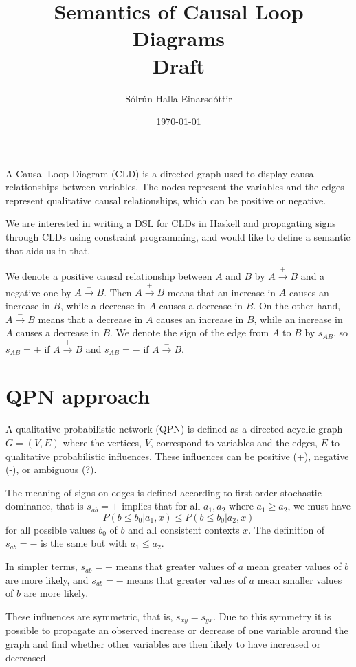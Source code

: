 \documentclass[a4paper,11pt]{article}
\title{Semantics of Causal Loop Diagrams\\ Draft}
\author{Sólrún Halla Einarsdóttir}
\date{\today}
\begin{document}
\maketitle
A Causal Loop Diagram (CLD) is a directed graph used to display causal
relationships between variables. The nodes represent the variables and the edges
represent qualitative causal relationships, which can be positive or negative.

We are interested in writing a DSL for CLDs in Haskell and propagating signs through CLDs
using constraint programming, and would like to define a semantic that aids us in that.

We denote a positive causal relationship between $A$ and $B$ by $A\xrightarrow{+} B$ and
a negative one by $A \xrightarrow{-} B$. Then $A \xrightarrow{+} B$ means that
an increase in $A$ causes an increase in $B$, while a decrease in $A$ causes a
decrease in $B$. On the other hand, $A\xrightarrow{-} B$ means that a decrease in $A$
causes an increase in $B$, while an increase in $A$ causes a decrease in $B$. We
denote the sign of the edge from $A$ to $B$ by $s_{AB}$, so $s_{AB}= +$ if
$A\xrightarrow{+} B$ and $s_{AB}=-$ if $A\xrightarrow{-} B$.
\section{QPN approach}
A qualitative probabilistic network (QPN) is defined as a directed acyclic graph
$G=(V,E)$ where the vertices, $V$, correspond to variables and the edges, $E$ to
qualitative probabilistic influences. These influences can be positive (+),
negative (-), or ambiguous (?).

The meaning of signs on edges is defined according to first order stochastic
dominance, that is $s_{ab}=+$ implies that for all $a_1,a_2$ where $a_1\geq
a_2$, we must have
\[P(b \leq b_0| a_1,x)\leq P(b\leq b_0| a_2,x)\]
for all possible values $b_0$ of $b$ and all consistent contexts $x$. The
definition of $s_{ab}=-$ is the same but with $a_1\leq a_2$.

In simpler terms, $s_{ab} = +$ means that greater values of $a$ mean greater
values of $b$ are more likely, and $s_{ab}=-$ means that greater values of $a$
mean smaller values of $b$ are more likely.

These influences are symmetric, that is, $s_{xy}=s_{yx}$.
Due to this symmetry it is possible to propagate an observed increase or
decrease of one variable around the graph and find whether other variables are
then likely to have increased or decreased.
\end{document}
